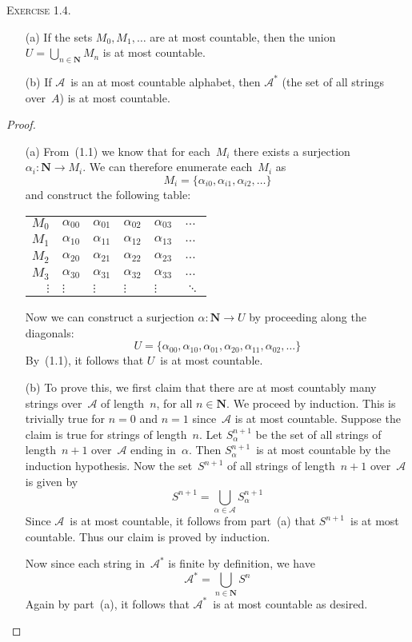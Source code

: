 \documentclass[letterpaper]{article}
\newcommand{\N}{\mathbf{N}}
\theoremstyle{remark}
\begin{document}
\noindent\textsc{Exercise 1.4.}
\begin{enumerate}
\item[(a)] If the sets $M_0,M_1,\ldots$ are at most countable, then the union $U=\bigcup_{n\in\N}M_n$ is at most countable.
\item[(b)] If $\mathcal{A}$~is an at most countable alphabet, then $\mathcal{A}^*$ (the set of all strings over~$A$) is at most countable.
\end{enumerate}
\begin{proof}
\begin{enumerate}
\item[(a)] From~(1.1) we know that for each~$M_i$ there exists a surjection $\alpha_i:\N\to M_i$. We can therefore enumerate each~$M_i$ as
$$M_i=\{\alpha_{i0},\alpha_{i1},\alpha_{i2},\ldots\}$$
and construct the following table:
\begin{center}
\begin{tabular}{r|lllll}
$M_0$&$\alpha_{00}$&$\alpha_{01}$&$\alpha_{02}$&$\alpha_{03}$&$\ldots$\\
$M_1$&$\alpha_{10}$&$\alpha_{11}$&$\alpha_{12}$&$\alpha_{13}$&$\ldots$\\
$M_2$&$\alpha_{20}$&$\alpha_{21}$&$\alpha_{22}$&$\alpha_{23}$&$\ldots$\\
$M_3$&$\alpha_{30}$&$\alpha_{31}$&$\alpha_{32}$&$\alpha_{33}$&$\ldots$\\
$\vdots$&$\vdots$&$\vdots$&$\vdots$&$\vdots$&$\ddots$
\end{tabular}
\end{center}
Now we can construct a surjection $\alpha:\N\to U$ by proceeding along the diagonals:
$$U=\{\alpha_{00},\alpha_{10},\alpha_{01},\alpha_{20},\alpha_{11},\alpha_{02},\ldots\}$$
By~(1.1), it follows that $U$~is at most countable.
\item[(b)] To prove this, we first claim that there are at most countably many strings over~$\mathcal{A}$ of length~$n$, for all $n\in\N$. We proceed by induction. This is trivially true for $n=0$ and $n=1$ since~$\mathcal{A}$ is at most countable. Suppose the claim is true for strings of length~$n$. Let $S_\alpha^{n+1}$ be the set of all strings of length~$n+1$ over~$\mathcal{A}$ ending in~$\alpha$. Then $S_\alpha^{n+1}$~is at most countable by the induction hypothesis. Now the set~$S^{n+1}$ of all strings of length~$n+1$ over~$\mathcal{A}$ is given by
$$S^{n+1}=\bigcup_{\alpha\in\mathcal{A}}S_\alpha^{n+1}$$
Since $\mathcal{A}$~is at most countable, it follows from part~(a) that $S^{n+1}$~is at most countable. Thus our claim is proved by induction.

Now since each string in~$\mathcal{A}^*$ is finite by definition, we have
$$\mathcal{A}^*=\bigcup_{n\in\N}S^n$$
Again by part~(a), it follows that $\mathcal{A}^*$~is at most countable as desired.
\end{enumerate}
\end{proof}
\end{document}
